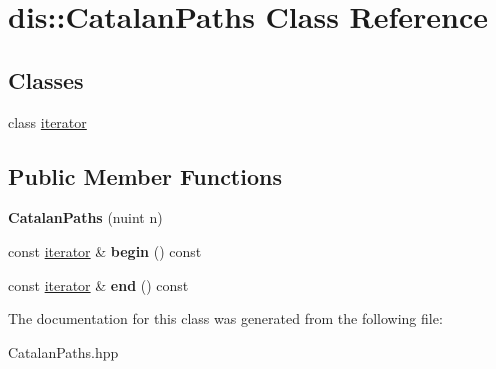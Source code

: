 \hypertarget{classdis_1_1_catalan_paths}{\section{dis\-:\-:Catalan\-Paths Class Reference}
\label{classdis_1_1_catalan_paths}
}
\subsection*{Classes}
\begin{DoxyCompactItemize}
\item 
class \hyperlink{classdis_1_1_catalan_paths_1_1iterator}{iterator}
\end{DoxyCompactItemize}
\subsection*{Public Member Functions}
\begin{DoxyCompactItemize}
\item 
\hypertarget{classdis_1_1_catalan_paths_a0a872b093be1eea5efb629283dc5d782}{{\bfseries Catalan\-Paths} (nuint n)}\label{classdis_1_1_catalan_paths_a0a872b093be1eea5efb629283dc5d782}

\item 
\hypertarget{classdis_1_1_catalan_paths_a21300403ec72d60f9449829ef2244021}{const \hyperlink{classdis_1_1_catalan_paths_1_1iterator}{iterator} \& {\bfseries begin} () const }\label{classdis_1_1_catalan_paths_a21300403ec72d60f9449829ef2244021}

\item 
\hypertarget{classdis_1_1_catalan_paths_adb8e3560e1263b649e447fb585fb994c}{const \hyperlink{classdis_1_1_catalan_paths_1_1iterator}{iterator} \& {\bfseries end} () const }\label{classdis_1_1_catalan_paths_adb8e3560e1263b649e447fb585fb994c}

\end{DoxyCompactItemize}


The documentation for this class was generated from the following file\-:\begin{DoxyCompactItemize}
\item 
Catalan\-Paths.\-hpp\end{DoxyCompactItemize}
